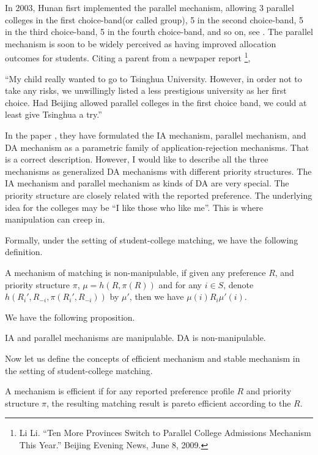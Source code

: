 In 2003, Hunan fisrt implemented the parallel mechanism, allowing 3
parallel colleges in the first choice-band(or called group), 5 in the second choice-band, 5 in the third choice-band, 5 in the fourth choice-band, and so on, see \parencite{YanChenJPE}.  The parallel mechanism is soon to be widely perceived as having improved allocation outcomes for students. Citing a parent from a newpaper report \footnote{Li Li. “Ten More Provinces Switch to Parallel College Admissions Mechanism This Year.” Beijing Evening News,
June 8, 2009.},

``My child really wanted to go to Tsinghua University. However,  in order not to
take any risks, we unwillingly listed a less prestigious university as her first choice.
Had Beijing allowed parallel colleges in the first choice band, we could at least give
Tsinghua a try.''

 In the paper  \parencite{YanChenJPE}, they have formulated the IA
 mechanism, parallel mechanism, and DA mechanism as a parametric
 family of application-rejection mechanisms. That is a correct
 description. However, I would like to describe all the three mechanisms
 as generalized DA mechanisms with different priority structures. The IA mechanism
 and parallel mechanism as kinds of DA are very special. The priority
 structure are closely related with the  reported
 preference. The underlying idea for the colleges may be ``I like
 those who like me''. This is where manipulation can creep in.

Formally, under the setting of student-college matching, we have the following definition.

\begin{definition}
A mechanism of matching is non-manipulable, if given any preference
$R$, and priority structure $\pi$, $\mu = h(R, \pi(R))$ and for any $i
\in S$, denote $h(R_i',R_{-i}, \pi(R_i',R_{-i}))$ by $\mu'$, then we have $\mu(i)R_i \mu'(i)$.
\end{definition}

We have the following proposition.

\begin{prop}
IA and parallel mechanisms are manipulable. DA is non-manipulable.
\end{prop}

 
Now let us define the concepts of efficient mechanism and stable
mechanism in the setting of student-college matching.

\begin{definition}
A mechanism is efficient if for any reported preference profile $R$ and
priority structure $\pi$, the resulting matching result is pareto
efficient according to the $R$.
\end{definition}


